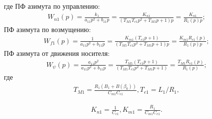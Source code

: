 где
ПФ азимута по управлению:
\begin{equation}
\label{eq:p4:s3.4}
\begin{multlined}
W_{n1}(p) = 
\frac{k_{1}}{a_{11}p^{2}+b_{11}p} = 
\frac{K_{n1}}{(T_{M1} T_{e1} p^2 + T_{M1} p +1)p} = 
\frac{K_{n1}}{R_1(p) p};
\end{multlined}
\end{equation}
ПФ азимута по возмущению:
\begin{equation}
\label{eq:p4:s3.5}
\begin{multlined}
W_{f1}(p) = \frac{1}{a_{11}p^{2}+b_{11}p} =  
\frac{K_{m1} (T_{e1} p +1)}{(T_{M1} T_{e1} p^2 + T_{M1} p +1)p} = 
\frac{K_{m1} R_{e1}(p)}{R_1(p)p};
\end{multlined}
\end{equation}
ПФ азимута от движения носителя:
\begin{equation}
\label{eq:p4:s3.6}
\begin{multlined}
W_{\psi}(p) = \frac{a_{11} p^2}{a_{11}p^{2}+b_{11}p} = 
\frac{T_{M1}(T_{e1} p +1)}{(T_{M1} T_{e1} p^2 + T_{M1} p +1)} = 
\frac{T_{M1}R_{e1}(p)}{R_1(p)};
\end{multlined}
\end{equation}
где 
\begin{equation}
\label{eq:p4:tt1}
\begin{aligned}
T_{M1} =\frac{R_1 (B_1 + B(\beta_0))}{C_{m1}C_{e1}},
T_{e1} = L_1/R_1,
\end{aligned}
\end{equation}

\begin{equation}
\label{eq:p4:kk1}
\begin{aligned}
K_{n1}=\frac{1}{C_{e1}},
K_{m1}= \frac{R_1}{C_{m1}C_{e1}}.
\end{aligned}
\end{equation}

